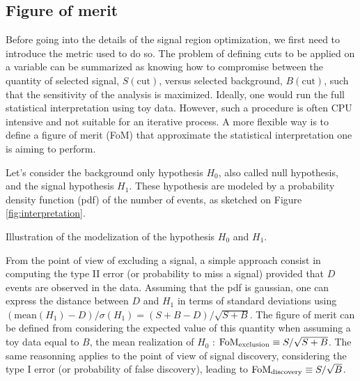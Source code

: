 


            \subsection{Figure of merit}

            Before going into the details of the signal region optimization, we first need to introduce the
            metric used to do so. The problem of defining cuts to be applied on a variable can be summarized 
            as knowing how to compromise between the quantity of selected signal, $S(\text{cut})$, versus selected
            background, $B(\text{cut})$, such that the sensitivity of the analysis is maximized. Ideally,
            one would run the full statistical interpretation using toy data. However, such a procedure 
            is often CPU intensive and not suitable for an iterative process. A more flexible way is
            to define a figure of merit (FoM) that approximate the statistical interpretation one is aiming
            to perform.

            Let's consider the background only hypothesis $H_0$, also called null hypothesis, and the 
            signal hypothesis $H_1$. These hypothesis are modeled by a probability density function (pdf) of 
            the number of events, as sketched on Figure \ref{fig:interpretation}.
           
                                         {Illustration of the modelization of the hypothesis $H_0$ and $H_1$.}

            From the point of view of excluding a signal, a simple approach consist in computing the type 
            II error (or probability to miss a signal) provided that $D$ events are observed in the
            data. Assuming that the pdf is gaussian, one can express the distance between $D$ and $H_1$ in terms 
            of standard deviations using $(\text{mean}(H_1) - D) / \sigma(H_1) = (S + B - D) / \sqrt{S+B}$.
            The figure of merit can be defined from considering the expected value of this quantity when assuming 
            a toy data equal to $B$, the mean realization of $H_0$ : $\text{FoM}_\text{exclusion} \equiv S 
            / \sqrt{S+B}$. The same reasonning applies to the point of view of signal discovery, considering 
            the type I error (or probability of false discovery), leading to $\text{FoM}_\text{discovery}
            \equiv S/\sqrt{B}$.

